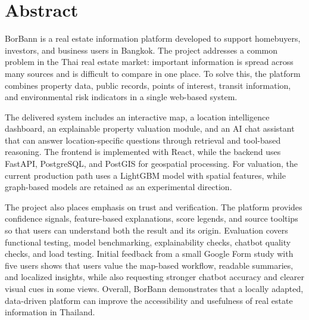 
\chapter*{Abstract}

BorBann is a real estate information platform developed to support homebuyers, investors, and business users in Bangkok. The project addresses a common problem in the Thai real estate market: important information is spread across many sources and is difficult to compare in one place. To solve this, the platform combines property data, public records, points of interest, transit information, and environmental risk indicators in a single web-based system.

The delivered system includes an interactive map, a location intelligence dashboard, an explainable property valuation module, and an AI chat assistant that can answer location-specific questions through retrieval and tool-based reasoning. The frontend is implemented with React, while the backend uses FastAPI, PostgreSQL, and PostGIS for geospatial processing. For valuation, the current production path uses a LightGBM model with spatial features, while graph-based models are retained as an experimental direction.

The project also places emphasis on trust and verification. The platform provides confidence signals, feature-based explanations, score legends, and source tooltips so that users can understand both the result and its origin. Evaluation covers functional testing, model benchmarking, explainability checks, chatbot quality checks, and load testing. Initial feedback from a small Google Form study with five users shows that users value the map-based workflow, readable summaries, and localized insights, while also requesting stronger chatbot accuracy and clearer visual cues in some views. Overall, BorBann demonstrates that a locally adapted, data-driven platform can improve the accessibility and usefulness of real estate information in Thailand.

\cleardoublepage
